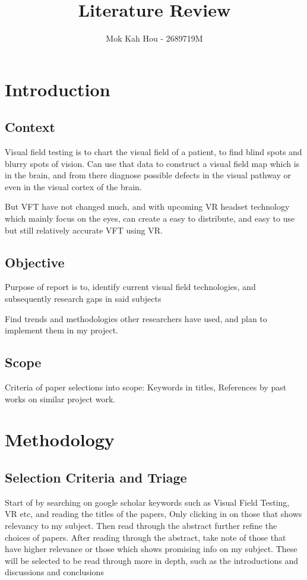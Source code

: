 \documentclass[11pt]{article}
\title{Literature Review}
\author{Mok Kah Hou - 2689719M}
\begin{document}
    \maketitle
    
\section{Introduction}
    \subsection{Context}
    Visual field testing is to chart the visual field of a patient, to find blind spots and blurry spots of vision. Can use that data to construct a visual field map which is in the brain, and from there diagnose possible defects in the visual pathway or even in the visual cortex of the brain.
    
    But VFT have not changed much, and with upcoming VR headset technology which mainly focus on the eyes, can create a easy to distribute, and easy to use but still relatively accurate VFT using VR.
    \subsection{Objective}
    Purpose of report is to, identify current visual field technologies, and subsequently research gaps in said subjects
    
    Find trends and methodologies other researchers have used, and plan to implement them in my project.
    
    \subsection{Scope}
    Criteria of paper selections into scope: Keywords in titles, References by past works on similar project work. 
    

\section{Methodology}
    \subsection{Selection Criteria and Triage}
     Start of by searching on google scholar keywords such as Visual Field Testing, VR etc, and reading the titles of the papers, Only clicking in on those that shows relevancy to my subject. Then read through the abstract further refine the choices of papers. After reading through the abstract, take note of those that have higher relevance or those which shows promising info on my subject. These will be selected to be read through more in depth, such as the introductions and discussions and conclusions
\end{document}
